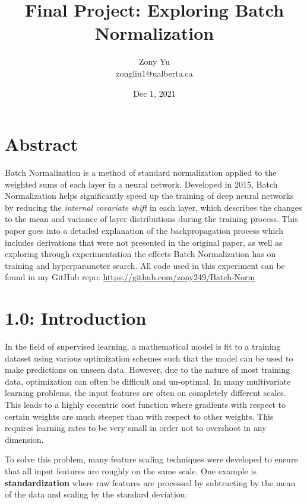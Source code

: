 \documentclass{article}
\title{Final Project: Exploring Batch Normalization}
\author{Zony Yu\\ zonglin1@ualberta.ca}
\date{Dec 1, 2021}
\begin{document}
\maketitle

\begin{multicols*}{2}






\section*{Abstract}

Batch Normalization is a method of standard normalization applied to the 
weighted sums of each layer in a neural network. Developed in 2015, Batch Normalization
helps significantly speed up the training of deep neural networks by reducing the 
\textit{internal covariate shift} in each layer, which describes the 
changes to the mean and variance of layer distributions during the training process. This
paper goes into a detailed explanation of the backpropagation process which includes
derivations that were not presented in the original paper, as well as exploring through 
experimentation the effects Batch Normalization has on training and hyperparameter search.
All code used in this experiment can be found in my GitHub repo: 
\url{https://github.com/zony249/Batch-Norm}


\section*{1.0: Introduction}
In the field of supervised learning, a mathematical model is fit to 
a training dataset using various optimization schemes such that the model 
can be used to make predictions on unseen data. However, 
due to the nature of most training data, optimization can often be
difficult and un-optimal. In many multivariate learning problems, the input features are
often on completely different scales. This leads to a highly eccentric cost
function where gradients with respect to certain weights are much steeper
than with respect to other weights. This requires learning rates to 
be very small in order not to overshoot in any dimension.

To solve this problem, many feature scaling techniques were developed to ensure
that all input features are roughly on the same scale. One example is \textbf{standardization}\cite{standardization}
where raw features are processed by subtracting by the mean of the data and 
scaling by the standard deviation:


\end{multicols*}
\end{document}
